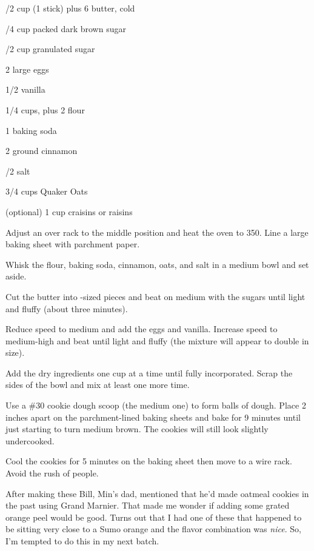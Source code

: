 \begin{IngredientsAndSteps}
    \ListIngredientsAndSteps
    {
        /2 cup (1 stick) plus 6 \Tbl[s] butter, cold

        /4 cup packed dark brown sugar

        /2 cup granulated sugar

        2 large eggs

        1/2 \tsp[s] vanilla

        1/4 cups, plus 2 \Tbl[s] flour

        1 \tsp baking soda

        2 \tsp[s] ground cinnamon

        /2 \tsp salt

        3/4 cups Quaker Oats

        (optional) 1 cup craisins or raisins
    }
    {
        Adjust an over rack to the middle position and heat the oven to 350\Degrees[F]. Line a large baking sheet
        with parchment paper.

        Whisk the flour, baking soda, cinnamon, oats, and salt in a medium bowl and set aside.

        Cut the butter into \Tbl-sized pieces and beat on medium with the sugars until light and fluffy
        (about three minutes).

        Reduce speed to medium and add the eggs and vanilla. Increase speed to medium-high and beat until
        light and fluffy (the mixture will appear to double in size).

        Add the dry ingredients one cup at a time until fully incorporated. Scrap the sides of the
        bowl and mix at least one more time.

        Use a \#30 cookie dough scoop (the medium one) to form balls of dough.
        Place 2 inches apart on the parchment-lined baking sheets and bake for 9 minutes until just starting
        to turn medium brown. The cookies will still look slightly undercooked.

        Cool the cookies for 5 minutes on the baking sheet then move to a wire rack. Avoid the rush of people.
    }
\end{IngredientsAndSteps}

\begin{Tip}
    {After making these Bill, Min's dad, mentioned that he'd made oatmeal cookies in the past using
        Grand Marnier. That made me wonder if adding some grated orange peel would be good. Turns out that
        I had one of these that happened to be sitting very close to a Sumo orange and the flavor
        combination was \emph{nice}. So, I'm tempted to do this in my next batch.}
\end{Tip}

